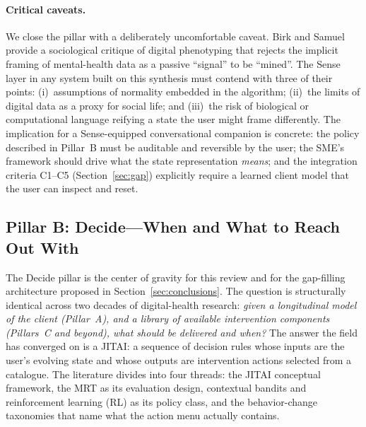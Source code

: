 \documentclass[11pt,a4paper]{article}
\newcommand{\secref}[1]{Section~\ref{#1}}
\begin{document}
\paragraph{Critical caveats.}
We close the pillar with a deliberately uncomfortable caveat. Birk
and Samuel~\cite{BirkSamuel2020DigitalPhenotypingCritique} provide a
sociological critique of digital phenotyping that rejects the
implicit framing of mental-health data as a passive ``signal'' to
be ``mined''. The Sense layer in any system built on this synthesis
must contend with three of their points: (i)~assumptions of
normality embedded in the algorithm; (ii)~the limits of digital
data as a proxy for social life; and (iii)~the risk of biological
or computational language reifying a state the user might frame
differently. The implication for a Sense-equipped conversational
companion is concrete: the policy described in Pillar~B must be
auditable and reversible by the user; the SME's framework should
drive what the state representation \emph{means}; and the
integration criteria \mbox{C1--C5} (\secref{sec:gap}) explicitly
require a learned client model that the user can inspect and reset.

\subsection{Pillar B: Decide---When and What to Reach Out With}\label{sec:decide}

The Decide pillar is the center of gravity for this review and for
the gap-filling architecture proposed in \secref{sec:conclusions}.
The question is structurally identical across two decades of
digital-health research: \emph{given a longitudinal model of the
client (Pillar~A), and a library of available intervention
components (Pillars~C and beyond), what should be delivered and
when?} The answer the field has converged on is a JITAI: a sequence
of decision rules whose inputs are the user's evolving state and
whose outputs are intervention actions selected from a catalogue.
The literature divides into four threads: the JITAI conceptual
framework, the MRT as its evaluation design, contextual bandits
and reinforcement learning (RL) as its policy class, and the
behavior-change taxonomies that name what the action menu actually
contains.
\end{document}
